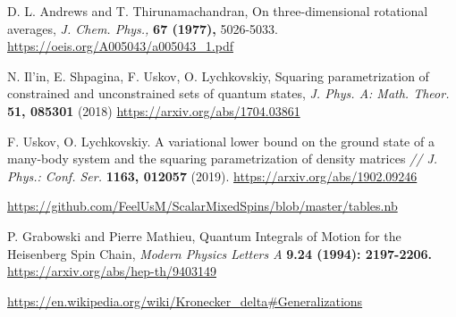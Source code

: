 \documentclass[]{article}
\renewcommand{\[}{\begin{equation}}
\renewcommand{\]}{\end{equation}}
\begin{document}
\begin{thebibliography}{3}
	D. L. Andrews and T. Thirunamachandran, On three-dimensional rotational averages, {\it J. Chem. Phys.,} {\bf 67 (1977),} 5026-5033.
	\href{https://oeis.org/A005043/a005043_1.pdf}
	{https://oeis.org/A005043/a005043\_1.pdf}
	
	 N. Il'in, E. Shpagina, F. Uskov, O. Lychkovskiy, 
	Squaring parametrization of constrained and unconstrained sets of quantum states, {\it J. Phys. A: Math. Theor.} {\bf 51, 085301} (2018)
	\href{https://arxiv.org/abs/1704.03861}{https://arxiv.org/abs/1704.03861}
	
	F. Uskov, O. Lychkovskiy. A variational lower bound on the ground state of a many-body system and
	the squaring parametrization of density matrices {\it// J. Phys.: Conf. Ser.} {\bf 1163, 012057} (2019).
	\href{https://arxiv.org/abs/1902.09246}{https://arxiv.org/abs/1902.09246}
	
	
	\href{https://github.com/FeelUsM/ScalarMixedSpins/blob/master/tables.nb}
	{https://github.com/FeelUsM/ScalarMixedSpins/blob/master/tables.nb}
	
	P. Grabowski and Pierre Mathieu, Quantum Integrals of Motion for the Heisenberg Spin Chain, {\it  Modern Physics Letters A} {\bf 9.24 (1994): 2197-2206.}
	\href{https://arxiv.org/abs/hep-th/9403149}{https://arxiv.org/abs/hep-th/9403149}
	
	\href{https://en.wikipedia.org/wiki/Kronecker_delta#Generalizations}
	{https://en.wikipedia.org/wiki/Kronecker\_delta\#Generalizations}
	
\end{thebibliography}
\end{document}
